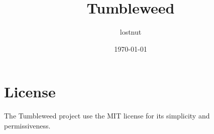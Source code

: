 

\title{Tumbleweed}
\author{lostnut}
\date{\today}


\maketitle
\tableofcontents
\listoffigures
\listoftables
\listoftodos

\section{License}%
\label{sec:license}

The Tumbleweed project use the MIT license for its simplicity and permissiveness.

